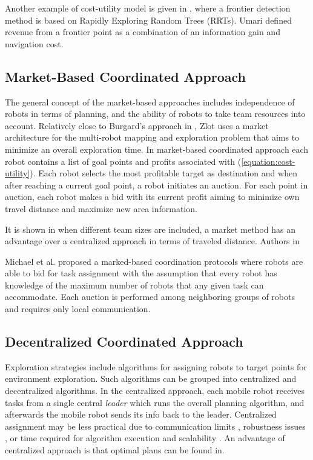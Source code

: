 Another example of cost-utility model is given in \cite{Umari2017}, where a frontier detection method is based on Rapidly Exploring Random Trees (RRTs). Umari defined revenue from a frontier point as a combination of an information gain and navigation cost. 


\subsection{Market-Based Coordinated Approach}

The general concept of the market-based approaches includes independence of robots in terms of planning, and the ability of robots to take team resources into account.
Relatively close to Burgard's approach in \cite{Burgard2000}, Zlot \cite{Zlot2002} uses a market architecture for the multi-robot mapping and exploration problem that aims to minimize an overall exploration time. In market-based coordinated approach each robot contains a list of goal points and profits associated with (\ref{equation:cost-utility}). Each robot selects the most profitable target as destination and when after reaching a current goal point, a robot initiates an auction. For each point in auction, each robot makes a bid with its current profit aiming to minimize own travel distance and maximize new area information.

It is shown in \cite{Dias2003} when different team sizes are included, a market method has an advantage over a centralized approach in terms of traveled distance. Authors in \cite{Zlot2002} 

Michael et al. \cite{Michael2008} proposed a marked-based coordination protocols where robots are able to bid for task assignment with the assumption that every robot has knowledge of the maximum number of robots that any given task can accommodate. Each auction is performed among neighboring groups of robots and requires only local communication.

\subsection{Decentralized Coordinated Approach}

Exploration strategies include algorithms for assigning robots to target points for environment exploration. Such algorithms can be grouped into centralized and decentralized algorithms. In the  centralized approach, each mobile robot receives tasks from a single central \emph{leader} which runs the overall planning algorithm, and afterwards the mobile robot sends its info back to the leader. Centralized assignment may be less practical due to communication limits \cite{Dias2000}, robustness issues \cite{Dias2006}, or time required for algorithm execution and scalability \cite{Julia2012}. An advantage of centralized approach is that optimal plans can be found in\cite{Yan2011}. 

